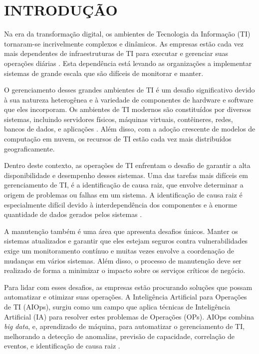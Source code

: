 \chapter{INTRODUÇÃO}

Na era da transformação digital, os ambientes de Tecnologia da Informação (TI) tornaram-se incrivelmente complexos e dinâmicos. As empresas estão cada vez mais dependentes de infraestruturas de TI para executar e gerenciar suas operações diárias \cite{pahl2015containerization}. Esta dependência está levando as organizações a implementar sistemas de grande escala que são difíceis de monitorar e manter. 

O gerenciamento desses grandes ambientes de TI é um desafio significativo devido à sua natureza heterogênea e à variedade de componentes de hardware e software que eles incorporam. Os ambientes de TI modernos são constituídos por diversos sistemas, incluindo servidores físicos, máquinas virtuais, contêineres, redes, bancos de dados, e aplicações \cite{pahl2015containerization}. Além disso, com a adoção crescente de modelos de computação em nuvem, os recursos de TI estão cada vez mais distribuídos geograficamente.

Dentro deste contexto, as operações de TI enfrentam o desafio de garantir a alta disponibilidade e desempenho desses sistemas. Uma das tarefas mais difíceis em gerenciamento de TI, é a identificação de causa raiz, que envolve determinar a origem de problemas ou falhas em um sistema. A identificação de causa raiz é especialmente difícil devido à interdependência dos componentes e à enorme quantidade de dados gerados pelos sistemas \cite{cohen2004correlating}.

A manutenção também é uma área que apresenta desafios únicos. Manter os sistemas atualizados e garantir que eles estejam seguros contra vulnerabilidades exige um monitoramento contínuo e muitas vezes envolve a coordenação de mudanças em vários sistemas. Além disso, o processo de manutenção deve ser realizado de forma a minimizar o impacto sobre os serviços críticos de negócio.

Para lidar com esses desafios, as empresas estão procurando soluções que possam automatizar e otimizar suas operações. A Inteligência Artificial para Operações de TI (AIOps), surgiu como um campo que aplica técnicas de Inteligência Artificial (IA) para resolver estes problemas de Operações (OPs). AIOps combina \textit{big data}, e, aprendizado de máquina, para automatizar o gerenciamento de TI, melhorando a detecção de anomalias, previsão de capacidade, correlação de eventos, e identificação de causa raiz \cite{sill2019aiops}.

